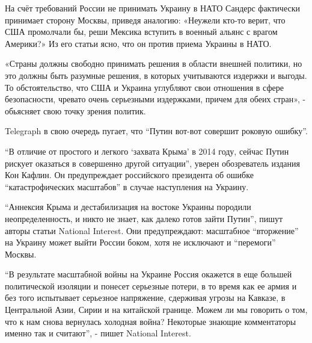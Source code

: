 \begin{multicols}{3}
На счёт требований России не принимать Украину в НАТО Сандерс фактически
принимает сторону Москвы, приведя аналогию: «Неужели кто-то верит, что США
промолчали бы, реши Мексика вступить в военный альянс с врагом Америки?» Из его
статьи ясно, что он против приема Украины в НАТО.

«Страны должны свободно принимать решения в области внешней политики, но это
должны быть разумные решения, в которых учитываются издержки и выгоды. То
обстоятельство, что США и Украина углубляют свои отношения в сфере
безопасности, чревато очень серьезными издержками, причем для обеих стран», -
обьясняет свою точку зрения политик.

Telegraph в свою очередь пугает, что \enquote{Путин вот-вот совершит роковую
ошибку}.

\enquote{В отличие от простого и легкого \enquote{захвата Крыма} в 2014 году,
сейчас Путин рискует оказаться в совершенно другой ситуации}, уверен
обозреватель издания Кон Кафлин. Он предупреждает российского президента об
ошибке \enquote{катастрофических масштабов} в случае наступления на Украину.  

\enquote{Аннексия Крыма и дестабилизация на востоке Украины породили
неопределенность, и никто не знает, как далеко готов зайти Путин}, пишут авторы
статьи National Interest. Они предупреждают: масштабное \enquote{вторжение} на
Украину может выйти России боком, хотя не исключают и \enquote{перемоги}
Москвы. 

\enquote{В результате масштабной войны на Украине Россия окажется в еще большей
политической изоляции и понесет серьезные потери, в то время как ее армия и без
того испытывает серьезное напряжение, сдерживая угрозы на Кавказе, в
Центральной Азии, Сирии и на китайской границе. Можем ли мы говорить о том, что
к нам снова вернулась холодная война? Некоторые знающие комментаторы именно так
и считают}, - пишет National Interest.


\end{multicols}
